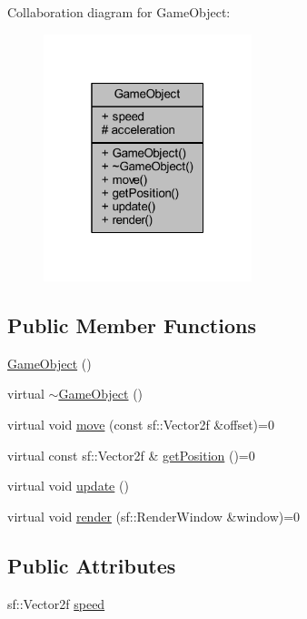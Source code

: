 Collaboration diagram for Game\+Object\+:
\nopagebreak
\begin{figure}[H]
\begin{center}
\leavevmode
\includegraphics[width=172pt]{class_game_object__coll__graph}
\end{center}
\end{figure}
\subsection*{Public Member Functions}
\begin{DoxyCompactItemize}
\item 
\hyperlink{class_game_object_a0348e3ee2e83d56eafca7a3547f432c4}{Game\+Object} ()
\item 
virtual \hyperlink{class_game_object_ab82dfdb656f9051c0587e6593b2dda97}{$\sim$\+Game\+Object} ()
\item 
virtual void \hyperlink{class_game_object_a370e89c4bb00a8fb851d9279480f7f76}{move} (const sf\+::\+Vector2f \&offset)=0
\item 
virtual const sf\+::\+Vector2f \& \hyperlink{class_game_object_a3c1da4d2eaaf8384f3ca10735673991e}{get\+Position} ()=0
\item 
virtual void \hyperlink{class_game_object_ad4a07f19f6c5e2e71c89c07486f26244}{update} ()
\item 
virtual void \hyperlink{class_game_object_a07a0da194460f2642732f45d7ad369e8}{render} (sf\+::\+Render\+Window \&window)=0
\end{DoxyCompactItemize}
\subsection*{Public Attributes}
\begin{DoxyCompactItemize}
\item 
sf\+::\+Vector2f \hyperlink{class_game_object_a485ee182e36f89f5493801bdd3c88d4a}{speed}
\end{DoxyCompactItemize}
